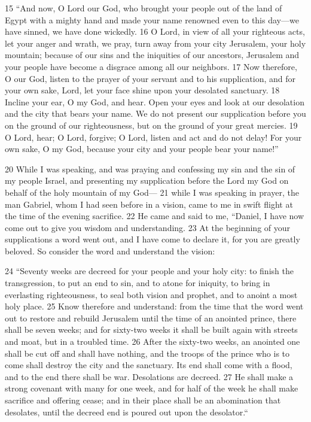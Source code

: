15 ``And now, O Lord our God, who brought your people out of the land of Egypt 
with a mighty hand and made your name renowned even to this day---we have sinned, 
we have done wickedly. 16 O Lord, in view of all your righteous acts, let your 
anger and wrath, we pray, turn away from your city Jerusalem, your holy 
mountain; because of our sins and the iniquities of our ancestors, Jerusalem and 
your people have become a disgrace among all our neighbors. 17 Now therefore, O 
our God, listen to the prayer of your servant and to his supplication, and for 
your own sake, Lord, let your face shine upon your desolated sanctuary. 18 
Incline your ear, O my God, and hear. Open your eyes and look at our desolation 
and the city that bears your name. We do not present our supplication before 
you on the ground of our righteousness, but on the ground of your great mercies.
19 O Lord, hear; O Lord, forgive; O Lord, listen and act and do not delay! For 
your own sake, O my God, because your city and your people bear your name!''

20 While I was speaking, and was praying and confessing my sin and the sin of my 
people Israel, and presenting my supplication before the Lord my God on behalf 
of the holy mountain of my God--- 21 while I was speaking in prayer, the man 
Gabriel, whom I had seen before in a vision, came to me in swift flight at the 
time of the evening sacrifice. 22 He came and said to me, ``Daniel, I have now 
come out to give you wisdom and understanding. 23 At the beginning of your 
supplications a word went out, and I have come to declare it, for you are 
greatly beloved. So consider the word and understand the vision:

24 ``Seventy weeks are decreed for your people and your holy city: to finish 
the transgression, to put an end to sin, and to atone for iniquity, to bring in 
everlasting righteousness, to seal both vision and prophet, and to anoint a most 
holy place. 25 Know therefore and understand: from the time that the word went 
out to restore and rebuild Jerusalem until the time of an anointed prince, 
there shall be seven weeks; and for sixty-two weeks it shall be built again with 
streets and moat, but in a troubled time. 26 After the sixty-two weeks, an 
anointed one shall be cut off and shall have nothing, and the troops of the 
prince who is to come shall destroy the city and the sanctuary. Its end shall 
come with a flood, and to the end there shall be war. Desolations are decreed.
27 He shall make a strong covenant with many for one week, and for half of the 
week he shall make sacrifice and offering cease; and in their place shall be an 
abomination that desolates, until the decreed end is poured out upon the 
desolator.``
